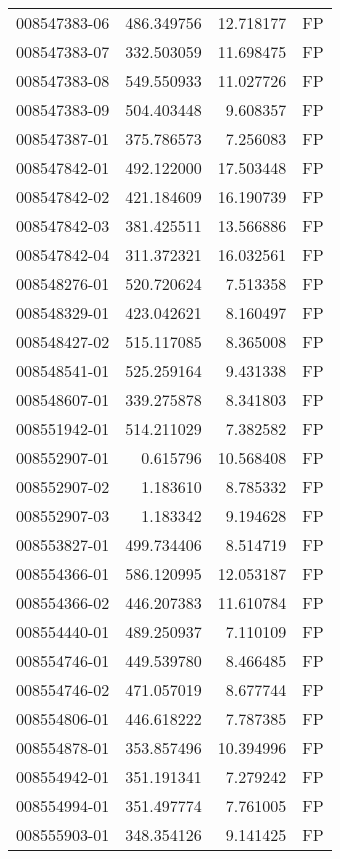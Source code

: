 \begin{tabular}{lrrl}
008547383-06 &  486.349756 &    12.718177 &   FP \\
008547383-07 &  332.503059 &    11.698475 &   FP \\
008547383-08 &  549.550933 &    11.027726 &   FP \\
008547383-09 &  504.403448 &     9.608357 &   FP \\
008547387-01 &  375.786573 &     7.256083 &   FP \\
008547842-01 &  492.122000 &    17.503448 &   FP \\
008547842-02 &  421.184609 &    16.190739 &   FP \\
008547842-03 &  381.425511 &    13.566886 &   FP \\
008547842-04 &  311.372321 &    16.032561 &   FP \\
008548276-01 &  520.720624 &     7.513358 &   FP \\
008548329-01 &  423.042621 &     8.160497 &   FP \\
008548427-02 &  515.117085 &     8.365008 &   FP \\
008548541-01 &  525.259164 &     9.431338 &   FP \\
008548607-01 &  339.275878 &     8.341803 &   FP \\
008551942-01 &  514.211029 &     7.382582 &   FP \\
008552907-01 &    0.615796 &    10.568408 &   FP \\
008552907-02 &    1.183610 &     8.785332 &   FP \\
008552907-03 &    1.183342 &     9.194628 &   FP \\
008553827-01 &  499.734406 &     8.514719 &   FP \\
008554366-01 &  586.120995 &    12.053187 &   FP \\
008554366-02 &  446.207383 &    11.610784 &   FP \\
008554440-01 &  489.250937 &     7.110109 &   FP \\
008554746-01 &  449.539780 &     8.466485 &   FP \\
008554746-02 &  471.057019 &     8.677744 &   FP \\
008554806-01 &  446.618222 &     7.787385 &   FP \\
008554878-01 &  353.857496 &    10.394996 &   FP \\
008554942-01 &  351.191341 &     7.279242 &   FP \\
008554994-01 &  351.497774 &     7.761005 &   FP \\
008555903-01 &  348.354126 &     9.141425 &   FP \\

\end{tabular}
